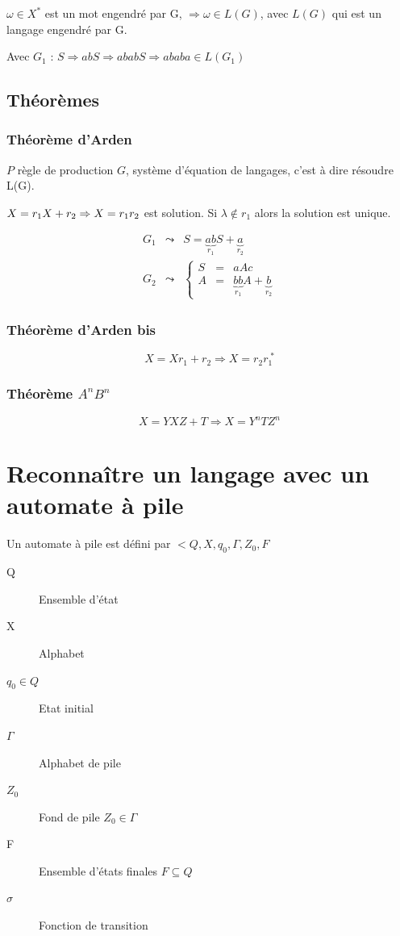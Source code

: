 \documentclass[12pt,a4paper,openany]{book}
\begin{document}
$\omega \in X^*$ est un mot engendré par G, $\Rightarrow \omega \in L(G)$, avec $L(G)$ qui est un langage engendré par G.

\begin{exemple}
	Avec $G_1$ : 
	$S \Rightarrow abS \Rightarrow ababS \Rightarrow ababa\in L(G_1)$
\end{exemple}

\subsection{Théorèmes}
\subsubsection{Théorème d'Arden}
$P$ règle de production $G$, système d'équation de langages, c'est à dire résoudre L(G).

	$X =  r_1 X + r_2 \Rightarrow X = r_1\* r_2$ est solution. Si $\lambda \not\in r_1$ alors la solution est unique.
\begin{exemple}
	\begin{eqnarray*}
		G_1 &\leadsto& S = \underbrace{ab}_{r_1}S + \underbrace{a}_{r_2}\\
		G_2 &\leadsto& \left\{\begin{array}{ccc} S& =& aAc\\
			A& =& \underbrace{bb}_{r_1}A+\underbrace{b}_{r_2}\end{array}\right.
	\end{eqnarray*}
\end{exemple}

\subsubsection{Théorème d'Arden bis}
$$X = Xr_1+r_2 \Rightarrow X=r_2r_1^{\;*}$$

\subsubsection{Théorème $A^nB^n$}
$$X = YXZ+T \Rightarrow X = Y^nTZ^n$$

\section{Reconnaître un langage avec un automate à pile}
	Un automate à pile est défini par $<Q,X,q_0,\Gamma, Z_0,F$
	\begin{description}
		\item[Q] Ensemble d'état
		\item[X] Alphabet
		\item[$q_0 \in Q$] Etat initial
		\item[$\Gamma$] Alphabet de pile
		\item[$Z_0$] Fond de pile $Z_0 \in \Gamma$
		\item[F] Ensemble d'états finales $F\subseteq Q$
		\item[$\sigma$] Fonction de transition 
	\end{description}
\end{document}
